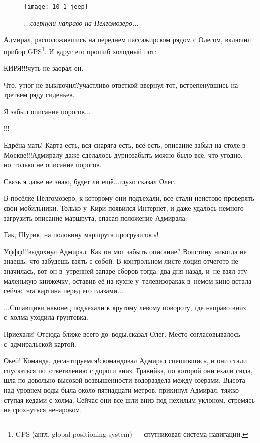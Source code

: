 	\begin{figure}[h]
		\centering
		\texttt{[image: 10\_1\_jeep]}
		\caption{\small\textit{...свернули направо на Нёлгомозеро...}}
	\end{figure}

Адмирал, расположившись на переднем пассажирском рядом с Олегом, включил прибор GPS\footnote{GPS (англ. global positioning system) --- спутниковая система навигации.}. И вдруг его прошиб холодный пот:

\diagdash КИРЯ!!!\mdash чуть не заорал он.

\diagdash Что, утюг не выключил?\mdash участливо ответкой ввернул тот, встрепенувшись на третьем ряду сиденьев.

\diagdash Я забыл описание порогов$\ldots$

\diagdash !!!

\diagdash Едрёна мать! Карта есть, вся снаряга есть, всё есть, описание забыл на столе в Москве!!!\mdash Адмиралу даже сделалось дурно\mdash забыть можно было всё, что угодно, но~только не описание порогов. 

\diagdash Связь я даже не знаю, будет ли ещё$\ldots$\mdash глухо сказал Олег.

В посёлке Нёлгомозеро, к которому они подъехали, все стали неистово проверять свои мобильники. Только у~Кири появился Интернет, и даже удалось немного загрузить описание маршрута, спасая положение Адмирала:

\diagdash Так, Шурик, на половину маршрута прогрузилось!

\diagdash Уф\sdash ф\sdash ф!!!\mdash выдохнул Адмирал. Как он мог забыть описание? Воистину никогда не знаешь, что забудешь взять с собой. В контрольном листе лоция отчего\sdash то не значилась, вот он в~утренней запаре сборов тогда, два дня назад, и~не взял эту маленькую книжечку, оставив её на кухне у~телевизора\mdash как в~немом кино встала сейчас эта картина перед его глазами$\ldots$

\vspace{0.5cm}
$\ldots$Cплавщики наконец подъехали к крутому левому повороту, где направо вниз с~холма уходила грунтовка. 

\diagdash Приехали! Отсюда ближе всего до~воды.\mdash сказал Олег. Место согласовывалось с~адмиральской картой. 

\diagdash Окей! Команда, десантируемся!\mdash скомандовал Адмирал спешившись, и они стали спускаться по~ответвлению с дороги вниз. Гравийка, по которой они ехали сюда, шла по довольно высокой возвышенности водораздела между озёрами. Высота над уровнем воды была около пятнадцати метров, прикинул Адмирал, тяжко ступая кедами с холма. Сейчас они все шли вниз под нехилым уклоном, стремясь не грохнуться ненароком.

